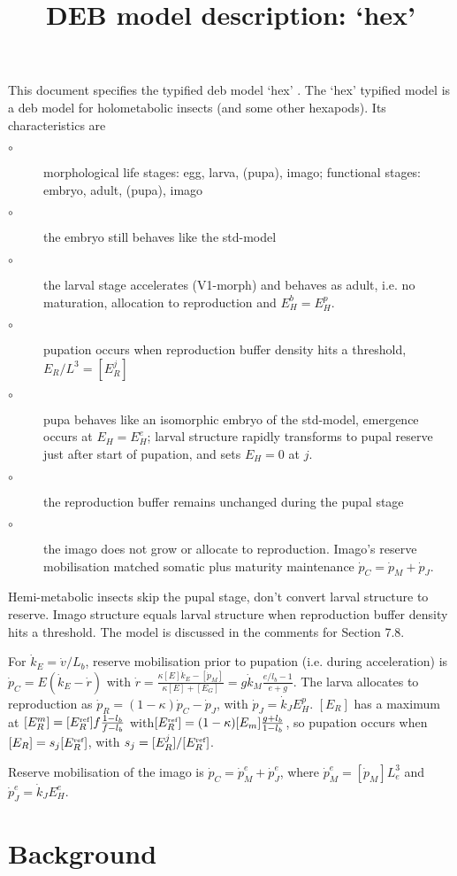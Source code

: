 \documentclass{article}
\title{DEB model description: `hex'}
\begin{document}
\maketitle

This document specifies the typified  {\sc deb}  model  `hex' \citep{MarqAugu2018}.
The `hex' typified model is a  {\sc deb} model for holometabolic insects (and some other hexapods). Its characteristics are
\begin{description}
  \item[$\circ$] morphological life stages: egg, larva, (pupa), imago; functional stages: embryo, adult, (pupa), imago
	
  \item[$\circ$] the embryo still behaves like the std-model
	
  \item[$\circ$] the larval stage accelerates (V1-morph) and behaves as adult, i.e. no maturation, allocation to reproduction and $E_H^b = E_H^p$.
	
  \item[$\circ$] pupation occurs when reproduction buffer density hits a threshold, $E_R/ L^3 = [E_R^j]$
	
  \item[$\circ$] pupa behaves like an isomorphic embryo of the std-model, emergence occurs at $E_H = E_H^e$;  larval structure rapidly transforms to pupal reserve just after start of pupation, and sets $E_H = 0$ at $j$.
		
  \item[$\circ$] the reproduction buffer remains unchanged during the pupal stage
	
  \item[$\circ$] the imago does not grow or allocate to reproduction. 
	  Imago's reserve mobilisation matched somatic plus maturity maintenance $\dot{p}_C = \dot{p}_M + \dot{p}_J$.
\end{description}
Hemi-metabolic insects skip the pupal stage, don't convert larval structure to reserve. 
Imago structure equals larval structure when reproduction buffer density hits a threshold.
The model is discussed in the comments for Section 7.8.

For $\dot{k}_E = \dot{v}/ L_b$, reserve mobilisation prior to pupation (i.e. during acceleration) is $\dot{p}_C = E (\dot{k}_E - \dot{r})$ 
  with $\dot{r} = \frac{\kappa [E] \dot{k}_E - [\dot{p}_M]} {\kappa [E] + [E_G]} = g \dot{k}_M \frac{e/ l_b - 1} {e + g}$.
The larva allocates to reproduction as $\dot{p}_R = (1- \kappa) \dot{p}_C - \dot{p}_J$, with $\dot{p}_J = \dot{k}_J E_H^p$.
$[E_R]$ has a maximum at $[E_R^m] = [E_R^{\mbox{\tiny ref}}] f \frac{1 - l_b} {f - l_b}$ with$[E_R^{\mbox{\tiny ref}}] = (1 - \kappa) [E_m] \frac{g + l_b} {1 - l_b}$, so pupation occurs when $[E_R] = s_j [E_R^{\mbox{\tiny ref}}]$, with $s_j = [E_R^j]/ [E_R^{\mbox{\tiny ref}}]$.

Reserve mobilisation of the imago is $\dot{p}_C = \dot{p}_M^e + \dot{p}_J^e$, where $\dot{p}_M^e = [\dot{p}_M] L_e^3$ and $\dot{p}_J^e = \dot{k}_J E_H^e$.


\section{Background}







\end{document}
